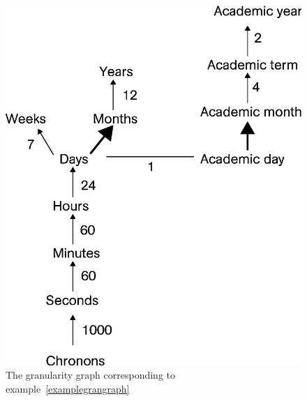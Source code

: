 

\begin{figure}
\centering
\includegraphics[scale=0.5]{graphs/granularityGraph.eps}
\caption{The granularity graph corresponding to example~\ref{examplegrangraph}}
\label{fig:granularity-graph-example}
\end{figure}

\vspace{-25pt}

